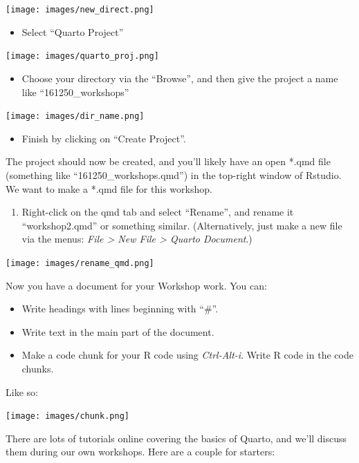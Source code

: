 \documentclass[
  letterpaper,
  DIV=11,
  numbers=noendperiod]{scrreprt}
\providecommand{\tightlist}{%
  \setlength{\itemsep}{0pt}\setlength{\parskip}{0pt}}\usepackage{longtable,booktabs,array}
\begin{document}
\texttt{[image: images/new\_direct.png]}

\begin{itemize}
\tightlist
\item
  Select ``Quarto Project''
\end{itemize}

\texttt{[image: images/quarto\_proj.png]}

\begin{itemize}
\tightlist
\item
  Choose your directory via the ``Browse'', and then give the project a
  name like ``161250\_workshops''
\end{itemize}

\texttt{[image: images/dir\_name.png]}

\begin{itemize}
\tightlist
\item
  Finish by clicking on ``Create Project''.
\end{itemize}

The project should now be created, and you'll likely have an open *.qmd
file (something like ``161250\_workshops.qmd'') in the top-right window
of Rstudio. We want to make a *.qmd file for this workshop.

\begin{enumerate}
\def\labelenumi{\arabic{enumi}.}
\setcounter{enumi}{4}
\tightlist
\item
  Right-click on the qmd tab and select ``Rename'', and rename it
  ``workshop2.qmd'' or something similar. (Alternatively, just make a
  new file via the menus: \emph{File \textgreater{} New File
  \textgreater{} Quarto Document}.)
\end{enumerate}

\texttt{[image: images/rename\_qmd.png]}

Now you have a document for your Workshop work. You can:

\begin{itemize}
\tightlist
\item
  Write headings with lines beginning with ``\#''.
\item
  Write text in the main part of the document.
\item
  Make a code chunk for your R code using \emph{Ctrl-Alt-i}. Write R
  code in the code chunks.
\end{itemize}

Like so:

\texttt{[image: images/chunk.png]}

There are lots of tutorials online covering the basics of Quarto, and
we'll discuss them during our own workshops. Here are a couple for
starters:
\end{document}
